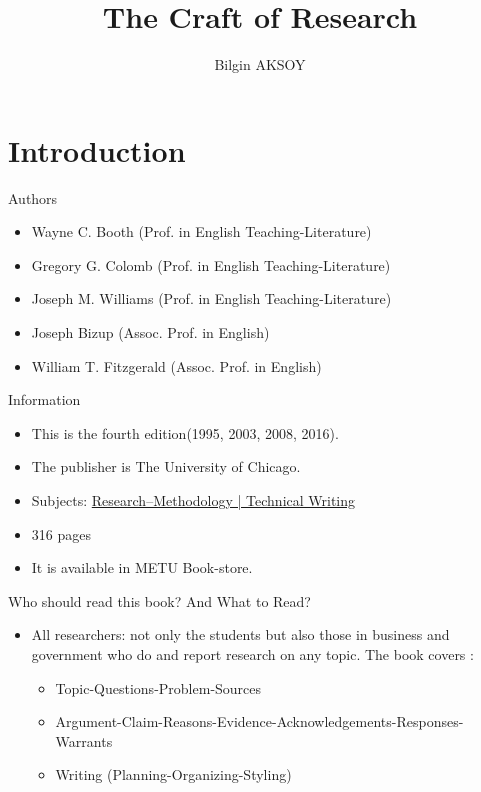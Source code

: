 \documentclass{beamer}
\title[The Craft of Research]{The Craft of Research}
\author{Bilgin AKSOY}
\institute{Informatics Institute}
\begin{document}
	\begin{frame}
	  \titlepage
	\end{frame}

\section{Introduction}
	\begin{frame}
	\begin{block}{Authors}
	\end{block}
		\begin{itemize}
			\item Wayne C. Booth (Prof. in English Teaching-Literature)
			\item Gregory G. Colomb (Prof. in English Teaching-Literature)
			\item Joseph M. Williams (Prof. in English Teaching-Literature)
			\item Joseph Bizup (Assoc. Prof. in English)
			\item William T. Fitzgerald (Assoc. Prof. in English)
		\end{itemize}			 
	\end{frame}
	\begin{frame}{Information}
		\begin{itemize}
			\item This is the fourth edition(1995, 2003, 2008, 2016).
			\item The publisher is The University of Chicago. 
			\item Subjects: \href{http://library.metu.edu.tr/search~S4/?searchtype=d&searcharg=research+methodolgy&searchscope=4&sortdropdown=-&SORT=DZ&extended=0&SUBMIT=Search&searchlimits=&searchorigarg=Xreaerch+methodolgy}{Research--Methodology | Technical Writing}
			\item 316 pages
			\item It is available in METU Book-store.
		\end{itemize}
	\end{frame}
	
	\setbeamercovered{transparent}
	\begin{frame}{Who should read this book? And What to Read?}
		\begin{itemize}
			 \item All researchers: not only the students but also those in business and government who do and report research on any topic. The book covers :
			\begin{itemize}
				 \item Topic-Questions-Problem-Sources
				\onslide<3-> \item Argument-Claim-Reasons-Evidence-Acknowledgements-Responses-Warrants
				\onslide<4-> \item Writing (Planning-Organizing-Styling)
			\end{itemize}
		\end{itemize}	
	\end{frame}
	
\end{document}
